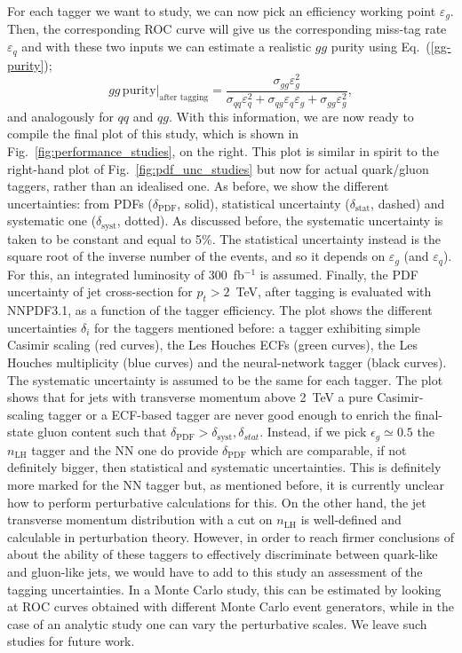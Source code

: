 For each tagger we want to study, we can now pick an efficiency working point $\varepsilon_g$. Then, the corresponding ROC curve will give us the corresponding miss-tag rate $\varepsilon_q$ and with these two inputs we can estimate a realistic $gg$ purity using Eq.~(\ref{gg-purity});
\begin{equation}\label{gg-purity-after-tagging}
gg \, \text{purity}\Big|_\text{after tagging}= \frac{\sigma_{gg} \varepsilon_g^2}{\sigma_{qq}\varepsilon_q^2+\sigma_{qg}\varepsilon_q \varepsilon_g +\sigma_{gg} \varepsilon_g^2},
\end{equation}
and analogously for $qq$ and $qg$. With this information, we are now ready to compile the final plot of this study, which is shown in Fig.~\ref{fig:performance_studies}, on the right. 
This plot is similar in spirit to the right-hand plot of Fig.~\ref{fig:pdf_unc_studies} but now for actual quark/gluon taggers, rather than an idealised one.
%
As before, we show the different uncertainties: from PDFs ($\delta_\text{PDF}$, solid), statistical uncertainty ($\delta_\text{stat}$, dashed) and systematic one ($\delta_\text{syst}$, dotted). As discussed before, the systematic uncertainty is taken to be constant and equal to 5\%. The statistical uncertainty instead is the square root of the inverse number of the events, and so it  depends on $\varepsilon_g$ (and $\varepsilon_q$). For this, an integrated luminosity of 300~fb$^{-1}$ is assumed. Finally,  the PDF uncertainty of jet cross-section for $p_t>2$~TeV, after tagging is evaluated with NNPDF3.1, as a function of the tagger efficiency. 
%
The plot shows the different uncertainties $\delta_i$ for the taggers mentioned before: a tagger exhibiting simple Casimir scaling (red curves), the Les Houches ECFs (green curves), the Les Houches multiplicity (blue curves) and the neural-network tagger (black curves). The systematic uncertainty is assumed to be the same for each tagger. 
%
The plot shows that for jets with transverse momentum above 2~TeV a pure Casimir-scaling tagger or a ECF-based tagger are never good enough to enrich the final-state gluon content such that $\delta_\text{PDF}> \delta_\text{syst}, \delta_{stat}$.
%
Instead, if we pick $\epsilon_g\simeq 0.5$ the $n_\text{LH}$ tagger and the NN one do provide $\delta_\text{PDF}$ which are comparable, if not definitely bigger, then statistical and systematic uncertainties. This is definitely more marked for the NN tagger but, as mentioned before, it is currently unclear how to perform perturbative calculations for this. On the other hand, the jet transverse momentum distribution with a cut on $n_\text{LH}$ is well-defined and calculable in perturbation theory. 
%
However, in order to reach firmer conclusions of about the ability of these taggers to effectively discriminate between quark-like and gluon-like jets, we would have to add to this study an assessment of the tagging uncertainties. In a Monte Carlo study, this can be estimated by looking at ROC curves obtained with different Monte Carlo event generators, while in the case of an analytic study one can vary the perturbative scales. We leave such studies for future work. 
